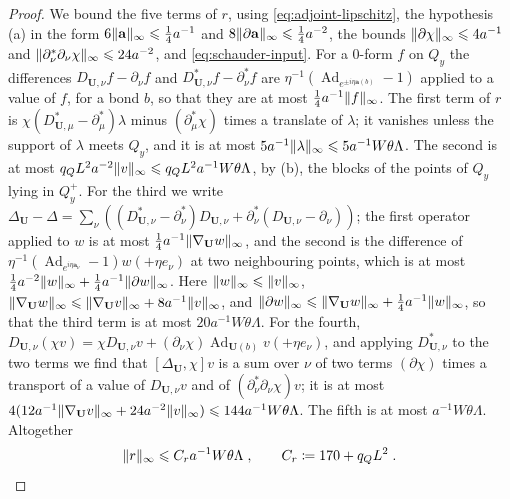 \documentclass[11pt]{preprint}
\makeatletter
\newcommand{\Ad}{\operatorname{Ad}}
\DeclarePairedDelimiter{\norm}{\lVert}{\rVert}
\newcommand*{\bigcdot}{}%
\DeclareRobustCommand*{\bigcdot}{%
	\mathbin{\mathpalette\bigcdot@{}}%
}
\newcommand*{\bigcdot@scalefactor}{.7}
\newcommand*{\bigcdot@widthfactor}{1.15}
\newcommand*{\bigcdot@}[2]{%
	\sbox0{$#1\vcenter{}$}%
	\sbox2{$#1\cdot\m@th$}%
	\hbox to \bigcdot@widthfactor\wd2{%
		\hss
		\raise\ht0\hbox{%
			\scalebox{\bigcdot@scalefactor}{%
				\lower\ht0\hbox{$#1\bullet\m@th$}%
			}%
		}%
		\hss
	}%
}
\numberwithin{equation}{section}
\makeatother
\begin{document}
\begin{proof}
We bound the five terms of $r$, using \eqref{eq:adjoint-lipschitz}, the hypothesis (a) in the form $6\norm{\mathbf a}_\infty \leqslant \frac{1}{4}a^{-1}$ and $8\norm{\partial\mathbf a}_\infty \leqslant \frac{1}{4}a^{-2}$, the bounds $\norm{\partial\chi}_\infty \leqslant 4a^{-1}$ and $\norm{\partial^*_\nu\partial_\nu\chi}_\infty \leqslant 24a^{-2}$, and \eqref{eq:schauder-input}. For a $0$-form $f$ on $Q_y$ the differences $D_{\mathbf U,\nu}f - \partial_\nu f$ and $D^*_{\mathbf U,\nu}f - \partial^*_\nu f$ are $\eta^{-1}(\Ad_{e^{\pm i\eta\mathbf a(b)}} - 1)$ applied to a value of $f$, for a bond $b$, so that they are at most $\frac{1}{4}a^{-1}\norm f_\infty$. The first term of $r$ is $\chi(D^*_{\mathbf U,\mu} - \partial^*_\mu)\lambda$ minus $(\partial^*_\mu\chi)$ times a translate of $\lambda$; it vanishes unless the support of $\lambda$ meets $Q_y$, and it is at most $5a^{-1}\norm\lambda_\infty \leqslant 5a^{-1}W\theta\Lambda$. The second is at most $q_QL^2a^{-2}\norm v_\infty \leqslant q_QL^2a^{-1}W\theta\Lambda$, by (b), the blocks of the points of $Q_y$ lying in $Q^+_y$. For the third we write $\Delta_{\mathbf U} - \Delta = \sum_\nu((D^*_{\mathbf U,\nu} - \partial^*_\nu)D_{\mathbf U,\nu} + \partial^*_\nu(D_{\mathbf U,\nu} - \partial_\nu))$; the first operator applied to $w$ is at most $\frac{1}{4}a^{-1}\norm{\nabla_{\mathbf U}w}_\infty$, and the second is the difference of $\eta^{-1}(\Ad_{e^{i\eta\mathbf a_\nu}} - 1)w(\bigcdot +\eta e_\nu)$ at two neighbouring points, which is at most $\frac{1}{4}a^{-2}\norm w_\infty + \frac{1}{4}a^{-1}\norm{\partial w}_\infty$. Here $\norm w_\infty \leqslant \norm v_\infty$, $\norm{\nabla_{\mathbf U}w}_\infty \leqslant \norm{\nabla_{\mathbf U}v}_\infty + 8a^{-1}\norm v_\infty$, and $\norm{\partial w}_\infty \leqslant \norm{\nabla_{\mathbf U}w}_\infty + \frac{1}{4}a^{-1}\norm w_\infty$, so that the third term is at most $20a^{-1}W\theta\Lambda$. For the fourth, $D_{\mathbf U,\nu}(\chi v) = \chi D_{\mathbf U,\nu}v + (\partial_\nu\chi)\Ad_{\mathbf U(b)}v(\bigcdot +\eta e_\nu)$, and applying $D^*_{\mathbf U,\nu}$ to the two terms we find that $[\Delta_{\mathbf U}, \chi]v$ is a sum over $\nu$ of two terms $(\partial\chi)$ times a transport of a value of $D_{\mathbf U,\nu}v$ and of $(\partial^*_\nu\partial_\nu\chi)v$; it is at most $4(12a^{-1}\norm{\nabla_{\mathbf U}v}_\infty + 24a^{-2}\norm v_\infty) \leqslant 144a^{-1}W\theta\Lambda$. The fifth is at most $a^{-1}W\theta\Lambda$. Altogether
\begin{equation}\label{eq:schauder-remainder}
    \norm r_\infty \leqslant C_ra^{-1}W\theta\Lambda\;,
    \qquad
    C_r \coloneqq 170 + q_QL^2\;.
\end{equation}


\end{proof}
\end{document}
